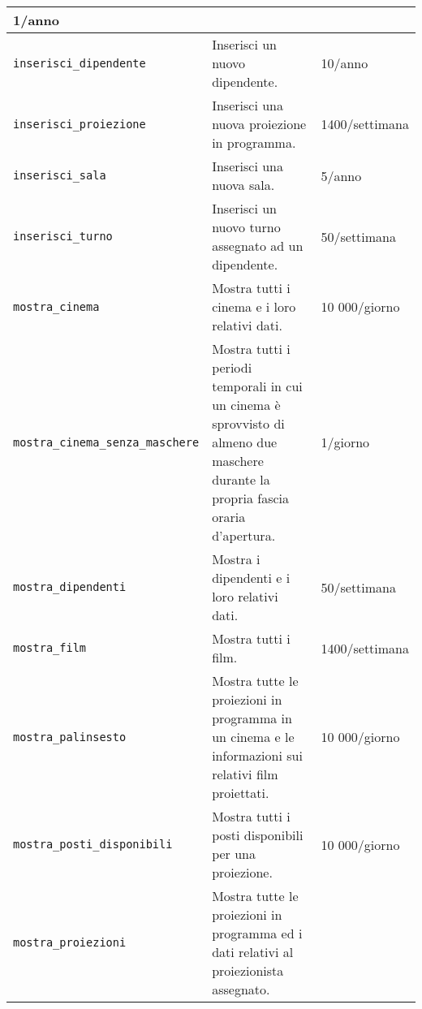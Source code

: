 \begin{longtable}{|p{5.33cm}|p{7.66cm}|p{2.88cm}|}
    1/anno
    \\ \hline
    \verb|inserisci_dipendente|                                   & %
    Inserisci un nuovo dipendente.                                &
    10/anno
    \\ \hline
    \verb|inserisci_proiezione|                                   & %
    Inserisci una nuova proiezione in programma.                  &
    1400/settimana
    \\ \hline
    \verb|inserisci_sala|                                         & %
    Inserisci una nuova sala.                                     &
    5/anno
    \\ \hline
    \verb|inserisci_turno|                                        & %
    Inserisci un nuovo turno assegnato ad un dipendente.          &
    50/settimana
    \\ \hline
    \verb|mostra_cinema|                                          & %
    Mostra tutti i cinema e i loro relativi dati.                 &
    10 000/giorno
    \\ \hline
    \verb|mostra_cinema_senza|\linebreak\verb|_maschere|          & %
    Mostra tutti i periodi temporali in cui un cinema è
    sprovvisto di almeno due maschere durante la propria
    fascia oraria d'apertura.                                     &
    1/giorno
    \\ \hline
    \verb|mostra_dipendenti|                                      & %
    Mostra i dipendenti e i loro relativi dati.                   &
    50/settimana
    \\ \hline
    \verb|mostra_film|                                            &
    Mostra tutti i film.                                          &
    1400/settimana
    \\ \hline
    \verb|mostra_palinsesto|                                      & %
    Mostra tutte le proiezioni in programma in un cinema e le
    informazioni sui relativi film proiettati.                    &
    10 000/giorno
    \\ \hline
    \verb|mostra_posti_disponibili|                               & %
    Mostra tutti i posti disponibili per una proiezione.          &
    10 000/giorno
    \\ \hline
    \verb|mostra_proiezioni|                                      & %
    Mostra tutte le proiezioni in programma ed i dati relativi al
    proiezionista assegnato.                                      &

\end{longtable}
